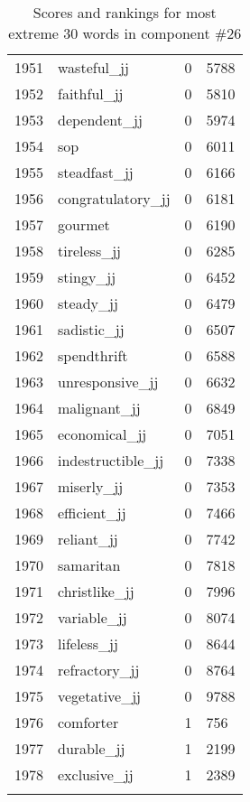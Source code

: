 \begin{longtable}[!htbp]{| rlr@{.}l |}
    1951 & wasteful\_jj & 0 & 5788 \\
    1952 & faithful\_jj & 0 & 5810 \\
    1953 & dependent\_jj & 0 & 5974 \\
    1954 & sop & 0 & 6011 \\
    1955 & steadfast\_jj & 0 & 6166 \\
    1956 & congratulatory\_jj & 0 & 6181 \\
    1957 & gourmet & 0 & 6190 \\
    1958 & tireless\_jj & 0 & 6285 \\
    1959 & stingy\_jj & 0 & 6452 \\
    1960 & steady\_jj & 0 & 6479 \\
    1961 & sadistic\_jj & 0 & 6507 \\
    1962 & spendthrift & 0 & 6588 \\
    1963 & unresponsive\_jj & 0 & 6632 \\
    1964 & malignant\_jj & 0 & 6849 \\
    1965 & economical\_jj & 0 & 7051 \\
    1966 & indestructible\_jj & 0 & 7338 \\
    1967 & miserly\_jj & 0 & 7353 \\
    1968 & efficient\_jj & 0 & 7466 \\
    1969 & reliant\_jj & 0 & 7742 \\
    1970 & samaritan & 0 & 7818 \\
    1971 & christlike\_jj & 0 & 7996 \\
    1972 & variable\_jj & 0 & 8074 \\
    1973 & lifeless\_jj & 0 & 8644 \\
    1974 & refractory\_jj & 0 & 8764 \\
    1975 & vegetative\_jj & 0 & 9788 \\
    1976 & comforter & 1 & 756 \\
    1977 & durable\_jj & 1 & 2199 \\
    1978 & exclusive\_jj & 1 & 2389 \\
    \hline
    \caption{Scores and rankings for most extreme 30 words in component \#26} \\
\end{longtable}
